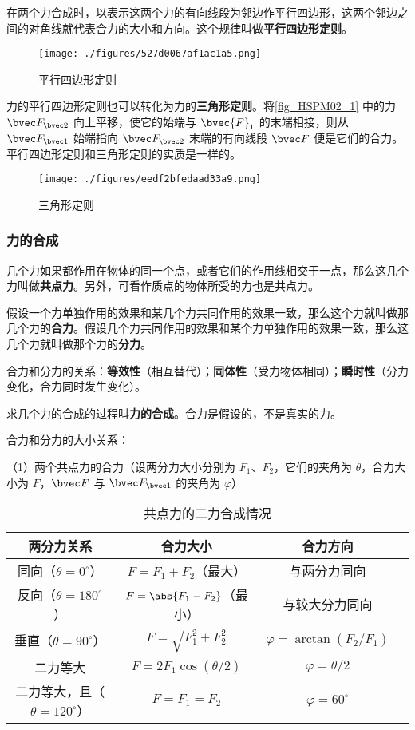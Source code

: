 在两个力合成时，以表示这两个力的有向线段为邻边作平行四边形，这两个邻边之间的对角线就代表合力的大小和方向。这个规律叫做\textbf{平行四边形定则}。
\begin{figure}[ht]
\centering
\texttt{[image: ./figures/527d0067af1ac1a5.png]}
\caption{平行四边形定则} \label{fig_HSPM02_1}
\end{figure}

力的平行四边形定则也可以转化为力的\textbf{三角形定则}。将\autoref{fig_HSPM02_1} 中的力 $\bvec F_{\bvec 2}$ 向上平移，使它的始端与 $\bvec {F}_1$ 的末端相接，则从 $\bvec F_{\bvec 1}$ 始端指向 $\bvec F_{\bvec 2}$ 末端的有向线段 $\bvec F$ 便是它们的合力。平行四边形定则和三角形定则的实质是一样的。
\begin{figure}[ht]
\centering
\texttt{[image: ./figures/eedf2bfedaad33a9.png]}
\caption{三角形定则} \label{fig_HSPM02_2}
\end{figure}

\subsubsection{力的合成}
几个力如果都作用在物体的同一个点，或者它们的作用线相交于一点，那么这几个力叫做\textbf{共点力}。另外，可看作质点的物体所受的力也是共点力。

假设一个力单独作用的效果和某几个力共同作用的效果一致，那么这个力就叫做那几个力的\textbf{合力}。假设几个力共同作用的效果和某个力单独作用的效果一致，那么这几个力就叫做那个力的\textbf{分力}。

合力和分力的关系：\textbf{等效性}（相互替代）；\textbf{同体性}（受力物体相同）；\textbf{瞬时性}（分力变化，合力同时发生变化）。

求几个力的合成的过程叫\textbf{力的合成}。合力是假设的，不是真实的力。

合力和分力的大小关系：

（1）两个共点力的合力（设两分力大小分别为 $F_1$、$F_2$，它们的夹角为 $\theta$，合力大小为 $F$，$\bvec F$ 与 $\bvec F_{\bvec 1}$ 的夹角为 $\varphi $）

\begin{table}[ht]
\centering
\caption{共点力的二力合成情况}\label{tab_HSPM02_1}
\begin{tabular}{|c|c|c|c|}
\hline
两分力关系 &  合力大小 & 合力方向 \\
\hline
同向（$\theta=0^{\circ}$） &  $F=F_1+F_2$（最大） & 与两分力同向 \\
\hline
反向（$\theta=180^{\circ}$） &  $F=\abs{F_1-F_2}$（最小） & 与较大分力同向 \\
\hline
垂直（$\theta=90^{\circ}$） &  $F=\sqrt{F_1^2+F_2^2}$ & $\varphi=\arctan{(F_2/F_1)}$ \\
\hline
二力等大 &  $F=2F_1\cos{(\theta/2)}$ & $\varphi=\theta/2$ \\
\hline
二力等大，且（$\theta=120^{\circ}$） &  $F=F_1=F_2$ & $\varphi=60^{\circ}$ \\
\hline
\end{tabular}
\end{table}

